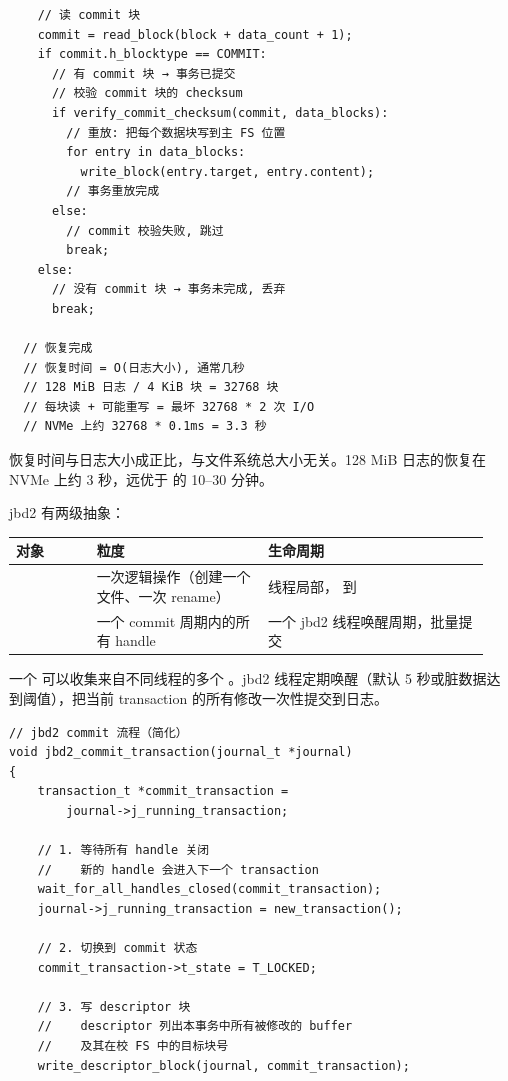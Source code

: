 \begin{filesystemlayout}
\begin{lstlisting}
    // 读 commit 块
    commit = read_block(block + data_count + 1);
    if commit.h_blocktype == COMMIT:
      // 有 commit 块 → 事务已提交
      // 校验 commit 块的 checksum
      if verify_commit_checksum(commit, data_blocks):
        // 重放: 把每个数据块写到主 FS 位置
        for entry in data_blocks:
          write_block(entry.target, entry.content);
        // 事务重放完成
      else:
        // commit 校验失败, 跳过
        break;
    else:
      // 没有 commit 块 → 事务未完成, 丢弃
      break;

  // 恢复完成
  // 恢复时间 = O(日志大小), 通常几秒
  // 128 MiB 日志 / 4 KiB 块 = 32768 块
  // 每块读 + 可能重写 = 最坏 32768 * 2 次 I/O
  // NVMe 上约 32768 * 0.1ms = 3.3 秒
\end{lstlisting}

恢复时间与日志大小成正比，与文件系统总大小无关。128 MiB 日志的恢复在 NVMe 上约 3 秒，远优于  的 10--30 分钟。


jbd2 有两级抽象：

\begin{longtable}{|F{0.16\linewidth}|F{0.34\linewidth}|F{0.44\linewidth}|}
\toprule
{}
对象 & 粒度 & 生命周期 \\
\midrule
{} & 一次逻辑操作（创建一个文件、一次 rename） & 线程局部， 到  \\\tablerowrule
{} & 一个 commit 周期内的所有 handle & 一个 jbd2 线程唤醒周期，批量提交 \\
\bottomrule
\end{longtable}

一个  可以收集来自不同线程的多个 。jbd2 线程定期唤醒（默认 5 秒或脏数据达到阈值），把当前 transaction 的所有修改一次性提交到日志。

\begin{lstlisting}
// jbd2 commit 流程（简化）
void jbd2_commit_transaction(journal_t *journal)
{
    transaction_t *commit_transaction =
        journal->j_running_transaction;

    // 1. 等待所有 handle 关闭
    //    新的 handle 会进入下一个 transaction
    wait_for_all_handles_closed(commit_transaction);
    journal->j_running_transaction = new_transaction();

    // 2. 切换到 commit 状态
    commit_transaction->t_state = T_LOCKED;

    // 3. 写 descriptor 块
    //    descriptor 列出本事务中所有被修改的 buffer
    //    及其在校 FS 中的目标块号
    write_descriptor_block(journal, commit_transaction);


\end{lstlisting}
\end{filesystemlayout}
